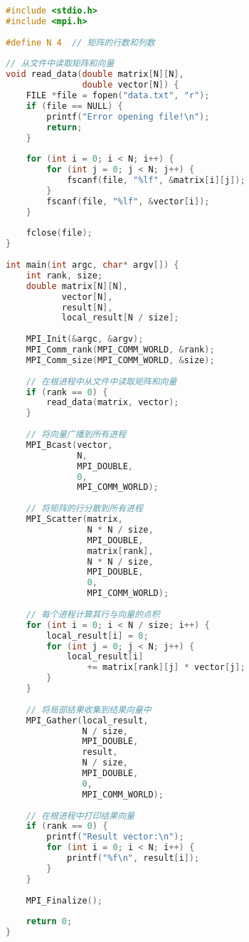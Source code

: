 \documentclass{ctexart}
\begin{document}
\begin{lstlisting}[language=C]
#include <stdio.h>    
#include <mpi.h>    
      
#define N 4  // 矩阵的行数和列数    
      
// 从文件中读取矩阵和向量  
void read_data(double matrix[N][N], 
               double vector[N]) {  
    FILE *file = fopen("data.txt", "r");  
    if (file == NULL) {  
        printf("Error opening file!\n");  
        return;  
    }  
      
    for (int i = 0; i < N; i++) {  
        for (int j = 0; j < N; j++) {  
            fscanf(file, "%lf", &matrix[i][j]);  
        }  
        fscanf(file, "%lf", &vector[i]);  
    }  
      
    fclose(file);  
}  
      
int main(int argc, char* argv[]) {    
    int rank, size;    
    double matrix[N][N], 
           vector[N], 
           result[N], 
           local_result[N / size];    
      
    MPI_Init(&argc, &argv);    
    MPI_Comm_rank(MPI_COMM_WORLD, &rank);    
    MPI_Comm_size(MPI_COMM_WORLD, &size);    
      
    // 在根进程中从文件中读取矩阵和向量  
    if (rank == 0) {    
        read_data(matrix, vector);  
    }    
    
    // 将向量广播到所有进程  
    MPI_Bcast(vector, 
              N, 
              MPI_DOUBLE, 
              0, 
              MPI_COMM_WORLD);    
      
    // 将矩阵的行分散到所有进程  
    MPI_Scatter(matrix, 
                N * N / size, 
                MPI_DOUBLE, 
                matrix[rank], 
                N * N / size, 
                MPI_DOUBLE, 
                0, 
                MPI_COMM_WORLD);    
      
    // 每个进程计算其行与向量的点积  
    for (int i = 0; i < N / size; i++) {    
        local_result[i] = 0;    
        for (int j = 0; j < N; j++) {    
            local_result[i] 
                += matrix[rank][j] * vector[j];    
        }    
    }    
      
    // 将局部结果收集到结果向量中  
    MPI_Gather(local_result, 
               N / size, 
               MPI_DOUBLE, 
               result, 
               N / size, 
               MPI_DOUBLE, 
               0, 
               MPI_COMM_WORLD);    
      
    // 在根进程中打印结果向量  
    if (rank == 0) {    
        printf("Result vector:\n");    
        for (int i = 0; i < N; i++) {    
            printf("%f\n", result[i]);    
        }    
    }    
      
    MPI_Finalize();    
      
    return 0;    
}    
\end{lstlisting}
\end{document}
